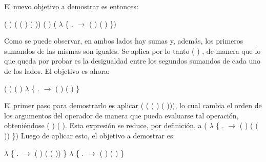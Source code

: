 \begin{AgdaAlign}
El nuevo objetivo a demostrar es entonces:
\begin{center}
\AgdaFunction{[}  \AgdaFunction{]} ( ) \AgdaFunction{+} ( ( ) ( )) \AgdaFunction{$\leq$} ( ) \AgdaFunction{+} ( $\lambda$ \{ . $\rightarrow$  ( ) ( ) \})
\end{center}

Como se puede observar, en ambos lados hay sumas y, además, los primeros sumandos de las mismas son iguales. Se aplica por lo tanto  ( ) , de manera que lo que queda por probar es la desigualdad entre los segundos sumandos de cada uno de los lados. El objetivo es ahora:
\begin{center}
\AgdaFunction{[}  \AgdaFunction{]}  ( ) ( ) \AgdaFunction{$\leq$}  $\lambda$ \{ . $\rightarrow$  ( ) ( ) \}
\end{center}

El primer paso para demostrarlo es aplicar (\AgdaFunction{$\sim\rightarrow\leq$} ( ( ) ( ))), lo cual cambia el orden de los argumentos del operador  de manera que pueda evaluarse tal operación, obteniéndose  ( ) ( ). Esta expresión se reduce, por definición, a ( $\lambda$ \{ . $\rightarrow$  ( ) ( ( )) \}) Luego de aplicar esto, el objetivo a demostrar es:
\begin{center}
\AgdaFunction{[}  \AgdaFunction{]}  $\lambda$ \{ . $\rightarrow$  ( ) ( ( )) \} \AgdaFunction{$\leq$}  $\lambda$ \{ . $\rightarrow$  ( ) ( ) \}
\end{center}


\end{AgdaAlign}
